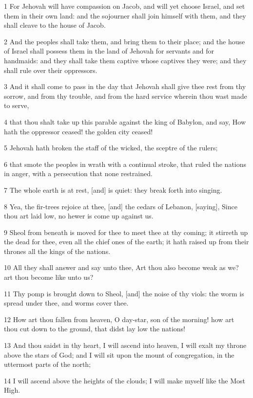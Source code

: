 \par 1 For Jehovah will have compassion on Jacob, and will yet choose Israel, and set them in their own land: and the sojourner shall join himself with them, and they shall cleave to the house of Jacob.
\par 2 And the peoples shall take them, and bring them to their place; and the house of Israel shall possess them in the land of Jehovah for servants and for handmaids: and they shall take them captive whose captives they were; and they shall rule over their oppressors.
\par 3 And it shall come to pass in the day that Jehovah shall give thee rest from thy sorrow, and from thy trouble, and from the hard service wherein thou wast made to serve,
\par 4 that thou shalt take up this parable against the king of Babylon, and say, How hath the oppressor ceased! the golden city ceased!
\par 5 Jehovah hath broken the staff of the wicked, the sceptre of the rulers;
\par 6 that smote the peoples in wrath with a continual stroke, that ruled the nations in anger, with a persecution that none restrained.
\par 7 The whole earth is at rest, [and] is quiet: they break forth into singing.
\par 8 Yea, the fir-trees rejoice at thee, [and] the cedars of Lebanon, [saying], Since thou art laid low, no hewer is come up against us.
\par 9 Sheol from beneath is moved for thee to meet thee at thy coming; it stirreth up the dead for thee, even all the chief ones of the earth; it hath raised up from their thrones all the kings of the nations.
\par 10 All they shall answer and say unto thee, Art thou also become weak as we? art thou become like unto us?
\par 11 Thy pomp is brought down to Sheol, [and] the noise of thy viols: the worm is spread under thee, and worms cover thee.
\par 12 How art thou fallen from heaven, O day-star, son of the morning! how art thou cut down to the ground, that didst lay low the nations!
\par 13 And thou saidst in thy heart, I will ascend into heaven, I will exalt my throne above the stars of God; and I will sit upon the mount of congregation, in the uttermost parts of the north;
\par 14 I will ascend above the heights of the clouds; I will make myself like the Most High.
